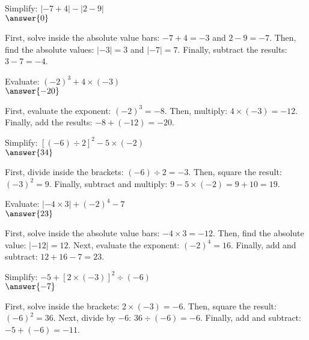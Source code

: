 \documentclass{ximera}
\begin{document}
\begin{problem}
Simplify: $| -7 + 4 | - | 2 - 9 |$\\
$\answer{0}$
\begin{feedback}
First, solve inside the absolute value bars: $-7 + 4 = -3$ and $2 - 9 = -7$. Then, find the absolute values: $|-3| = 3$ and $|-7| = 7$. Finally, subtract the results: $3 - 7 = -4$.
\end{feedback}
\end{problem}

\begin{problem}
Evaluate: $(-2)^3 + 4 \times (-3)$\\
$\answer{-20}$
\begin{feedback}
First, evaluate the exponent: $(-2)^3 = -8$. Then, multiply: $4 \times (-3) = -12$. Finally, add the results: $-8 + (-12) = -20$.
\end{feedback}
\end{problem}

\begin{problem}
Simplify: $[(-6) \div 2]^2 - 5 \times (-2)$\\
$\answer{34}$
\begin{feedback}
First, divide inside the brackets: $(-6) \div 2 = -3$. Then, square the result: $(-3)^2 = 9$. Finally, subtract and multiply: $9 - 5 \times (-2) = 9 + 10 = 19$.
\end{feedback}
\end{problem}

\begin{problem}
Evaluate: $| -4 \times 3 | + (-2)^4 - 7$\\
$\answer{23}$
\begin{feedback}
First, solve inside the absolute value bars: $-4 \times 3 = -12$. Then, find the absolute value: $|-12| = 12$. Next, evaluate the exponent: $(-2)^4 = 16$. Finally, add and subtract: $12 + 16 - 7 = 23$.
\end{feedback}
\end{problem}

\begin{problem}
Simplify: $-5 + [2 \times (-3)]^2 \div (-6)$\\
$\answer{-7}$
\begin{feedback}
First, solve inside the brackets: $2 \times (-3) = -6$. Then, square the result: $(-6)^2 = 36$. Next, divide by $-6$: $36 \div (-6) = -6$. Finally, add and subtract: $-5 + (-6) = -11$.
\end{feedback}
\end{problem}

\end{document}
